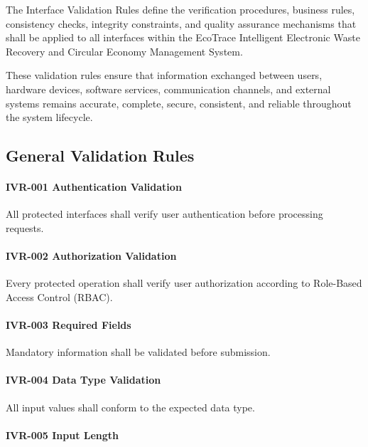 The Interface Validation Rules define the verification procedures,
business rules, consistency checks, integrity constraints, and quality
assurance mechanisms that shall be applied to all interfaces within the
EcoTrace Intelligent Electronic Waste Recovery and Circular Economy
Management System.

These validation rules ensure that information exchanged between users,
hardware devices, software services, communication channels, and
external systems remains accurate, complete, secure, consistent, and
reliable throughout the system lifecycle.


\subsection{General Validation Rules}

\paragraph{IVR-001 Authentication Validation}

All protected interfaces shall verify user authentication before
processing requests.

\paragraph{IVR-002 Authorization Validation}

Every protected operation shall verify user authorization according to
Role-Based Access Control (RBAC).

\paragraph{IVR-003 Required Fields}

Mandatory information shall be validated before submission.

\paragraph{IVR-004 Data Type Validation}

All input values shall conform to the expected data type.

\paragraph{IVR-005 Input Length}

